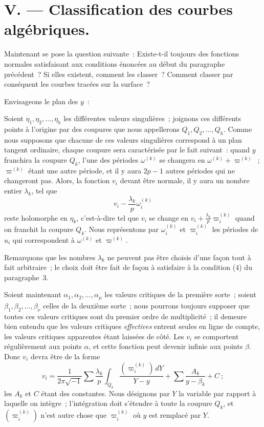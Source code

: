 \documentclass{article}
\begin{document}
\section*{V. --- Classification des courbes algébriques.}

Maintenant se pose la question suivante~: Existe-t-il toujours des fonctions normales satisfaisant aux conditions énoncées au début du paragraphe précédent~? Si elles existent, comment les classer~? Comment classer par conséquent les courbes tracées sur la surface~?

Envisageons le plan des $y$~:

Soient $\eta_{1}, \eta_{2}, \ldots, \eta_{h}$ les différentes valeurs singulières~; joignons ces différents points à l'origine par des coupures que nous appellerons $Q_{1}, Q_{2}, \ldots, Q_{h}$. Comme nous supposons que chacune de ces valeurs singulières correspond à un plan tangent ordinaire, chaque
coupure sera caractérisée par le fait suivant~: quand $y$ franchira la coupure $Q_{k}$, l'une des périodes $\omega^{(k)}$ se changera en $\omega^{(k)} + \varpi^{(k)}$~; $\varpi^{(k)}$ étant une autre période, et il y aura $2p - 1$ autres périodes qui ne changeront pas. Alors, la fonction $v_{i}$ devant être normale, il y aura un nombre entier $\lambda_{k}$, tel que
\[
v_{i} - \frac{\lambda_{k}}{p} \omega_{i}^{(k)}
\]
reste holomorphe en $\eta_{k}$, c'est-à-dire tel que $v_{i}$ se change en $v_{i} + \frac{\lambda_{k}}{p} \varpi_{i}^{(k)}$ quand on franchit la coupure $Q_{k}$. Nous représentons par $\omega_{i}^{(k)}$ et $\varpi_{i}^{(k)}$ les périodes de $u_{i}$ qui correspondent à $\omega^{(k)}$ et $\varpi^{(k)}$.

Remarquons que les nombres $\lambda_{k}$ ne peuvent pas être choisis d'une façon tout à fait arbitraire~; le choix doit être fait de façon à satisfaire à la condition (4) du paragraphe~3.

Soient maintenant $\alpha_{1}, \alpha_{2}, \ldots, \alpha_{\mu}$ les valeurs critiques de la première sorte~; soient $\beta_{1}, \beta_{2}, \ldots, \beta_{\nu}$ celles de la deuxième sorte~; nous pourrons toujours supposer que toutes ces valeurs critiques sont du premier ordre de multiplicité~; il demeure bien entendu que les valeurs critiques \emph{effectives} entrent seules en ligne de compte, les valeurs critiques apparentes étant laissées de côté. Les $v_{i}$ se comportent régulièrement aux points $\alpha$, et cette fonction peut devenir infinie aux points $\beta$. Donc $v_{i}$ devra être de la forme
\[
v_{i} = \frac{1}{2 \pi \sqrt{-1}} \sum \frac{\lambda_{k}}{p} \int_{Q_{k}} \frac{(\varpi_{i}^{(k)}) \,dY}{Y - y} + \sum \frac{A_{k}}{y - \beta_{k}} + C~; \tag{1}
\]
les $A_{k}$ et $C$ étant des constantes. Nous désignons par $Y$ la variable par rapport à laquelle on intègre~; l'intégration doit s'étendre à toute la coupure $Q_{k}$, et $(\varpi_{i}^{(k)})$ n'est autre chose que $\varpi_{i}^{(k)}$ où $y$ est remplacé par $Y$.
\end{document}
